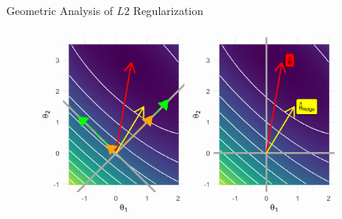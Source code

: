 \documentclass[11pt,compress,t,notes=noshow, xcolor=table]{beamer}
\begin{document}
\begin{vbframe}{Geometric Analysis of $L2$ Regularization}
\begin{figure}
\includegraphics[width=0.9\textwidth]{figure/l2_reg_hess_03_plot.png}\\
\end{figure}


\framebreak

  
  
  
  \begin{columns}
    \begin{column}{0.5\textwidth}
      

\end{column}
\end{columns}
\end{vbframe}
\end{document}

